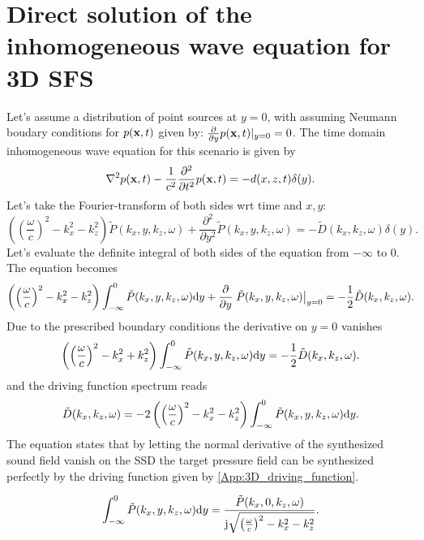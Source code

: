 \section{Direct solution of the inhomogeneous wave equation for 3D SFS}

Let's assume a distribution of point sources at $y = 0$, with assuming Neumann boudary conditions for $p(\mathbf{x},t)$ given by: $\frac{\partial}{\partial y} p(\mathbf{x}, t)|_{y = 0} = 0$. The time domain inhomogeneous wave equation for this scenario is given by
\begin{equation}
\nabla^2 p(\mathbf{x},t) - \frac{1}{c^2}\frac{\partial^2}{\partial t^2} p(\mathbf{x},t) = - d(x,z,t)\delta(y).
\end{equation}
Let's take the Fourier-transform of both sides wrt time and $x,y$:
\begin{equation}
\left( \left( \frac{\omega}{c}  \right)^2 -  k_x^2 - k_z^2 \right) \tilde{P}(k_x,y,k_z,\omega) + \frac{\partial^2}{\partial y^2}  \tilde{P}(k_x,y,k_z,\omega) = - \tilde{D}(k_x,k_z,\omega)\delta(y).
\end{equation}
Let's evaluate the definite integral of both sides of the equation from $-\infty$ to 0. The equation becomes
\begin{equation}
\left( \left( \frac{\omega}{c}  \right)^2 - k_x^2 - k_z^2 \right) \int_{-\infty}^{0} \tilde{P}(k_x,y,k_z,\omega) \mathrm{d} y + \frac{\partial}{\partial y}  \left. \tilde{P}(k_x,y,k_z,\omega)\right|_{y = 0} = -\frac{1}{2}\tilde{D}(k_x,k_z,\omega).
\end{equation}
Due to the prescribed boundary conditions the derivative on $y=0$ vanishes
\begin{equation}
\left( \left( \frac{\omega}{c}  \right)^2 - k_x^2 + k_z^2 \right) \int_{-\infty}^{0} \tilde{P}(k_x,y,k_z,\omega) \mathrm{d} y  = -\frac{1}{2}\tilde{D}(k_x,k_z,\omega).
\end{equation}
and the driving function spectrum reads
\begin{equation}
\tilde{D}(k_x,k_z,\omega)
= -2 \left( \left( \frac{\omega}{c}  \right)^2 - k_x^2 - k_z^2 \right) \int_{-\infty}^{0} \tilde{P}(k_x,y,k_z,\omega) \mathrm{d} y .
\label{App:3D_driving_function}
\end{equation}
The equation states that by letting the normal derivative of the synthesized sound field vanish on the SSD the target pressure field can be synthesized perfectly by the driving function given by \eqref{App:3D_driving_function}.
 
\begin{equation}
\int_{-\infty}^{0} \tilde{P}(k_x,y,k_z,\omega) \mathrm{d} y 
=
\frac{\tilde{P}(k_x,0,k_z,\omega)}{\mathrm{j} \sqrt{\left( \frac{\omega}{c}  \right)^2 - k_x^2 - k_z^2 } }
.
\label{App:3D_driving_function}
\end{equation}

